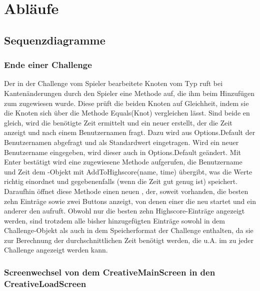 \chapter{Abläufe}

\section{Sequenzdiagramme}

\subsection{Ende einer Challenge}

Der in der Challenge vom Spieler bearbeitete Knoten vom Typ  ruft bei Kantenänderungen durch den Spieler eine Methode auf, die ihm beim Hinzufügen zum  zugewiesen wurde. Diese prüft die beiden Knoten auf Gleichheit, indem sie die Knoten sich über die Methode Equals(Knot) vergleichen lässt. Sind beide en gleich, wird die benötigte Zeit ermittelt und ein neuer  erstellt, der die Zeit anzeigt und nach einem Benutzernamen fragt.
\newline
\newline
Dazu wird aus Options.Default der Benutzernamen abgefragt und als Standardwert eingetragen. Wird ein neuer Benutzername eingegeben, wird dieser auch in Options.Default geändert. Mit Enter bestätigt wird eine zugewiesene Methode aufgerufen, die Benutzername und Zeit dem -Objekt mit AddToHighscore(name, time) übergibt, was die Werte richtig einordnet und gegebenenfalls (wenn die Zeit gut genug ist) speichert.
\newline
\newline
Daraufhin öffnet diese Methode einen neuen , der, soweit vorhanden, die besten zehn Einträge sowie zwei Buttons anzeigt, von denen einer die  neu startet und ein anderer den  aufruft. Obwohl nur die besten zehn Highscore-Einträge angezeigt werden, sind trotzdem alle bisher hinzugefügten Einträge sowohl in dem Challenge-Objekt als auch in dem Speicherformat der Challenge enthalten, da sie zur Berechnung der durchschnittlichen Zeit benötigt werden, die u.A. im  zu jeder Challenge angezeigt werden kann.

\subsection{Screenwechsel von dem CreativeMainScreen in den CreativeLoadScreen}

